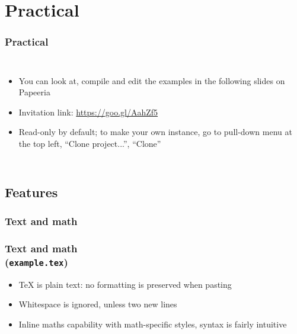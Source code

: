 \documentclass[xetex,colorlinks]{beamer} %
\begin{document}
  \section{Practical}
  \begin{frame}
    \frametitle{Practical}
    \begin{columns}
      \begin{itemize}
      \item You can look at, compile and edit the examples in the following slides on Papeeria
      \item Invitation link: \href{https://www.papeeria.com/join?token_id=f5d56e17-d2a0-4965-b11d-0e608bc28e08&retry=3}{https://goo.gl/AahZf5}
      \item Read-only by default; to make your own instance, go to pull-down menu at the top left, ``Clone project...'', ``Clone''
      \end{itemize}
    \end{columns}
  \end{frame}

  
  \subsection{Features}
  \subsubsection{Text and math}
  \begin{frame}
    \frametitle{Text and math \\ (\texttt{example.tex})}
    \begin{itemize}
     \item \TeX{} is plain text: no formatting is preserved when pasting
     \item Whitespace is ignored, unless two new lines
     \item Inline maths capability with math-specific styles, syntax is fairly intuitive
    \end{itemize}
  \end{frame}
  
\end{document}
